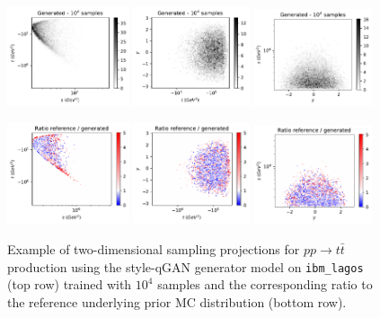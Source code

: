 \documentclass[twocolumn,preprintnumbers,superscriptaddress]{revtex4-2}
\begin{document}
\begin{figure}

  \includegraphics[width=0.32\textwidth]{plots/hardware_1k/ibm_lagos/s-t_FAKE_IBM_10k.pdf}%
  \includegraphics[width=0.305\textwidth]{plots/hardware_1k/ibm_lagos/t-y_FAKE_IBM_10k.pdf}%
  \includegraphics[width=0.31\textwidth]{plots/hardware_1k/ibm_lagos/y-s_FAKE_IBM_10k.pdf}

  \includegraphics[width=0.32\textwidth]{plots/hardware_1k/ibm_lagos/s-t_RATIO_IBM_10k.pdf}%
  \includegraphics[width=0.305\textwidth]{plots/hardware_1k/ibm_lagos/t-y_RATIO_IBM_10k.pdf}%
  \includegraphics[width=0.31\textwidth]{plots/hardware_1k/ibm_lagos/y-s_RATIO_IBM_10k.pdf}

  \caption{\label{fig:ibm}Example of two-dimensional sampling projections for
  $pp \rightarrow t\bar{t}$ production using the style-qGAN generator
  model on {\tt ibm\_lagos} (top row) trained with $10^4$ samples and
  the corresponding ratio to the reference underlying prior MC
  distribution (bottom row).}
\end{figure}
\end{document}
